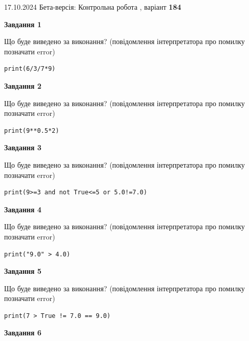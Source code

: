 \documentclass[12pt, ukrainian]{article}
\begin{document}
{\Large{17.10.2024 Бета-версія: Контрольна робота , варіант  \No \textbf { 184 }\par}}
{
\begin {large}
{\begin {center}\textbf{Завдання 1}\end {center}}

Що буде виведено за виконання? (повідомлення інтерпретатора про помилку позначати error)\par
\begin{verbatim}
print(6/3/7*9)
\end{verbatim}

{\begin {center}\textbf{Завдання 2}\end {center}}

Що буде виведено за виконання? (повідомлення інтерпретатора про помилку позначати error)\par
\begin{verbatim}
print(9**0.5*2)
\end{verbatim}

{\begin {center}\textbf{Завдання 3}\end {center}}

Що буде виведено за виконання? (повідомлення інтерпретатора про помилку позначати error)\par
\begin{verbatim}
print(9>=3 and not True<=5 or 5.0!=7.0)
\end{verbatim}

{\begin {center}\textbf{Завдання 4}\end {center}}

Що буде виведено за виконання? (повідомлення інтерпретатора про помилку позначати error)\par
\begin{verbatim}
print("9.0" > 4.0)
\end{verbatim}

{\begin {center}\textbf{Завдання 5}\end {center}}

Що буде виведено за виконання? (повідомлення інтерпретатора про помилку позначати error)\par
\begin{verbatim}
print(7 > True != 7.0 == 9.0)
\end{verbatim}

{\begin {center}\textbf{Завдання 6}\end {center}}


\end{large}}
\end{document}
